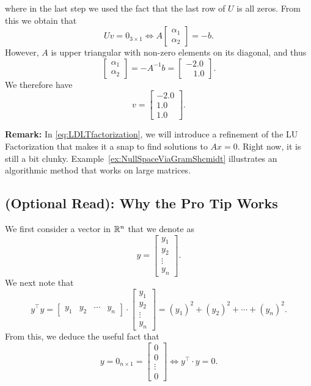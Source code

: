 where in the last step we used the fact that the last row of $U$ is all zeros. From this we obtain that 
$$ U v = 0_{3 \times 1} \iff  A  \left[
\begin{array}{c}
\alpha_1 \\
\alpha_2 
\end{array}
\right]  = - b.$$
However, $A$ is upper triangular with non-zero elements on its diagonal, and thus  
$$ \left[ \begin{array}{c}
\alpha_1 \\
\alpha_2 
\end{array}
\right] = -A^{-1} b = \begin{bmatrix}
-2 .0 \\~~ ~~1.0
\end{bmatrix}. $$
We therefore have 
$$ v =  \left[
\begin{array}{r}
-2.0 \\
1.0 \\
1.0
\end{array}
\right]. $$
 \Qed
\vspace*{.2cm}

\textbf{Remark:} In \eqref{eq:LDLTfactorization}, we will introduce a refinement of the LU Factorization that makes it a snap to find solutions to $Ax=0$. Right now, it is still a bit clunky. Example~\ref{ex:NullSpaceViaGramShcmidt} illustrates an algorithmic method that works on large matrices.

\subsection{(Optional Read): Why the Pro Tip Works}
\label{sec:ProofProTip}

We first consider a vector in $\mathbb R^n$ that we denote as 
$$ y = \left[\begin{array}{c} y_1 \\ y_2 \\ \vdots \\ y_n \end{array} \right].$$
We next note that
$$ y^\top y = \left[\begin{array}{cccc} y_1 & y_2 & \cdots & y_n \end{array} \right] \cdot \left[\begin{array}{c} y_1 \\ y_2 \\ \vdots \\ y_n \end{array} \right] = (y_1)^2 + (y_2)^2 + \cdots + (y_n)^2.$$
From this, we deduce the useful fact that $$y = 0_{n \times 1} = \left[\begin{array}{c} 0 \\0 \\ \vdots \\0 \end{array} \right] \iff y^\top \cdot y = 0.$$

